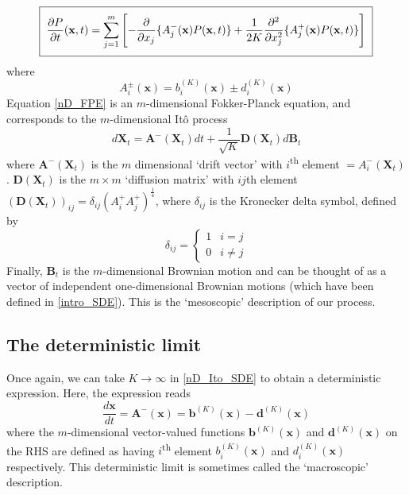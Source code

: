 \begin{equation}
\label{nD_FPE}
\setlength{\fboxsep}{2\fboxsep}\boxed{\frac{\partial P}{\partial t}(\mathbf{x},t) = \sum\limits_{j=1}^{m}\left[-\frac{\partial}{\partial x_j}\{A_j^{-}(\mathbf{x})P(\mathbf{x},t)\} + \frac{1}{2K}\frac{\partial^2}{\partial x_j^2}\{A_j^{+}(\mathbf{x})P(\mathbf{x},t)\}\right]}
\end{equation}
where
\begin{equation*}
A_{i}^{\pm}(\mathbf{x}) = b^{(K)}_i(\mathbf{x})\pm d^{(K)}_i(\mathbf{x})
\end{equation*}
Equation \eqref{nD_FPE} is an $m$-dimensional Fokker-Planck equation, and corresponds to the $m$-dimensional It\^o process
\begin{equation}
\label{nD_Ito_SDE}
d\mathbf{X}_{t} = \mathbf{A^-}(\mathbf{X}_t)dt + \frac{1}{\sqrt{K}}\mathbf{D}(\mathbf{X}_t)d\mathbf{B}_t
\end{equation}
where $\mathbf{A^-}(\mathbf{X}_t)$ is the $m$ dimensional `drift vector' with $i$\textsuperscript{th} element $ = A^{-}_{i}(\mathbf{X}_t)$. $\mathbf{D}(\mathbf{X}_t)$ is the $m \times m$ `diffusion matrix' with $ij$th element $\left(\mathbf{D}(\mathbf{X}_t)\right)_{ij} = \delta_{ij}\left(A^{+}_{i}A^{+}_{j}\right)^{\frac{1}{4}}$, where $\delta_{ij}$ is the Kronecker delta symbol, defined by
\begin{equation*}
\delta_{ij} = 
\begin{cases}
1 & i=j\\
0 & i\neq j
\end{cases}
\end{equation*}
Finally, $\mathbf{B}_t$ is the $m$-dimensional Brownian motion and can be thought of as a vector of independent one-dimensional Brownian motions (which have been defined in \ref{intro_SDE}). This is the `mesoscopic' description of our process.

\subsection{The deterministic limit}
Once again, we can take $K \to \infty$ in \eqref{nD_Ito_SDE} to obtain a deterministic expression. Here, the expression reads
\begin{equation}
\label{nD_det_limit}
\frac{d\mathbf{x}}{dt} = \mathbf{A^-}(\mathbf{x}) = \mathbf{b}^{(K)}(\mathbf{x}) - \mathbf{d}^{(K)}(\mathbf{x})
\end{equation}
where the $m$-dimensional vector-valued functions $\mathbf{b}^{(K)}(\mathbf{x})$ and $\mathbf{d}^{(K)}(\mathbf{x})$ on the RHS are defined as having $i$\textsuperscript{th} element $b^{(K)}_i(\mathbf{x})$ and $d^{(K)}_i(\mathbf{x})$ respectively. This deterministic limit is sometimes called the `macroscopic' description.
